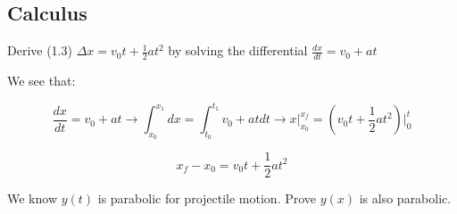 
\subsection*{Calculus}


\begin{question}
Derive (1.3) $\Delta x = v_0t + \frac{1}{2}at^2$ by solving the differential $\frac{dx}{dt} = v_0 + at$
\end{question}

\begin{solution}
We see that:

\begin{equation*}
    \frac{dx}{dt} = v_0+at \rightarrow
    \int_{x_0}^{x_1}dx=\int_{t_0}^{t_1}v_0+atdt \rightarrow
    x \Big|_{x_0}^{x_f} =  (v_0t+\frac{1}{2}at^2)\Big|_{0}^{t}
\end{equation*}

\begin{equation*}
    x_f-x_0 = v_0t+\frac{1}{2}at^2
\end{equation*}

\end{solution}


\begin{question}
We know $y(t)$ is parabolic for projectile motion. Prove $y(x)$ is also parabolic.
\end{question}

